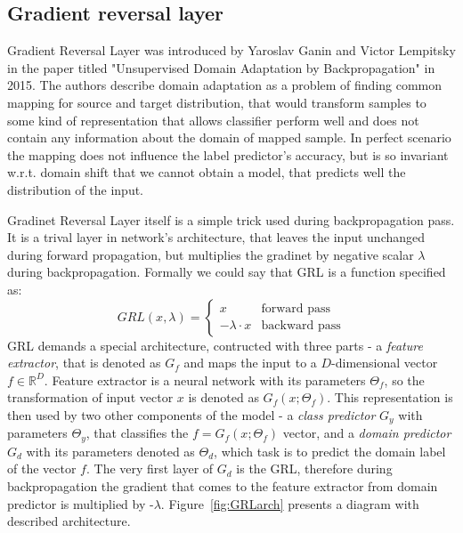 \documentclass{article}
\begin{document}
\subsection{Gradient reversal layer}
Gradient Reversal Layer was introduced by Yaroslav Ganin and Victor Lempitsky in the paper titled "Unsupervised Domain Adaptation by Backpropagation" in 2015. The authors describe domain adaptation as a problem of finding common mapping for source and target distribution, that would transform samples to some kind of representation that allows classifier perform well and does not contain any information about the domain of mapped sample. In perfect scenario the mapping does not influence the label predictor's accuracy, but is so invariant w.r.t. domain shift that we cannot obtain a model, that predicts well the distribution of the input.
\par
Gradinet Reversal Layer itself is a simple trick used during backpropagation pass. It is a trival layer in network's architecture, that leaves the input unchanged during forward propagation, but multiplies the gradinet by negative scalar $\lambda$ during backpropagation. Formally we could say that GRL is a function specified as:
\begin{equation*}
GRL(x, \lambda) = \begin{cases}
x &\text{forward pass}\\
-\lambda \cdot x &\text{backward pass}
\end{cases}
\end{equation*}
GRL demands a special architecture, contructed with three parts - a \textit{feature extractor}, that is denoted as $G_{f}$ and maps the input to a $D$-dimensional vector $f \in \mathbb{R}^{D}$. Feature extractor is a neural network with its parameters $\Theta_{f}$, so the transformation of input vector $x$ is denoted as $G_{f}(x;\Theta_{f})$. This representation is then used by two other components of the model - a \textit{class predictor} $G_{y}$ with parameters $\Theta_{y}$, that classifies the $f = G_{f}(x;\Theta_{f})$ vector, 
and a \textit{domain predictor} $G_{d}$ with its parameters denoted as $\Theta_{d}$, which task is to predict the domain label of the vector $f$. The very first layer of $G_{d}$ is the GRL, therefore during backpropagation the gradient that comes to the feature extractor from domain predictor is multiplied by -$\lambda$. Figure~\ref{fig:GRLarch} presents a diagram with described architecture.
\par
\end{document}
